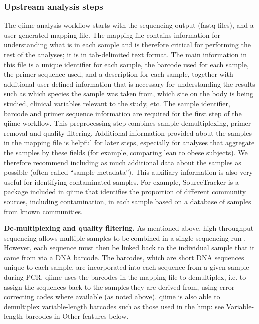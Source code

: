 \subsubsection{Upstream analysis steps}

The \gls{qiime} analysis workflow starts with the sequencing output (fastq files), and a user-generated
mapping file. The mapping file contains information for understanding what is in each sample and is
therefore critical for performing the rest of the analyses; it is in tab-delimited text format. The main
information in this file is a unique identifier for each sample, the barcode used for each sample, the primer
sequence used, and a description for each sample, together with additional user-defined information that is
necessary for understanding the results such as which species the sample was taken from, which site on the
body is being studied, clinical variables relevant to the study, etc. The sample identifier, barcode and
primer sequence information are required for the first step of the \gls{qiime} workflow. This preprocessing
step combines sample demultiplexing, primer removal and quality-filtering. Additional information provided
about the samples in the mapping file is helpful for later steps, especially for analyses that aggregate
the samples by these fields (for example, comparing lean to obese subjects). We therefore recommend
including as much additional data about the samples as possible (often called “sample metadata”). This
auxiliary information is also very useful for identifying contaminated samples. For example,
SourceTracker \cite{Knights2011} is a package included in \gls{qiime} that identifies the proportion
of different community sources, including contamination, in each sample based on a database of samples
from known communities.

\textbf{De-multiplexing and quality filtering.} As mentioned above, high-throughput sequencing allows
multiple samples to be combined in a single sequencing run \cite{Kuczynski2011}. However, each sequence
must then be linked back to the individual sample that it came from via a DNA barcode. The barcodes,
which are short DNA sequences unique to each sample, are incorporated into each sequence from a given
sample during PCR. \gls{qiime} uses the barcodes in the mapping file to demultiplex, i.e. to assign the
sequences back to the samples they are derived from, using error-correcting codes where available
(as noted above). \gls{qiime} is also able to demultiplex variable-length barcodes such as those used in
the \gls{hmp}: see Variable-length barcodes in Other features below.

